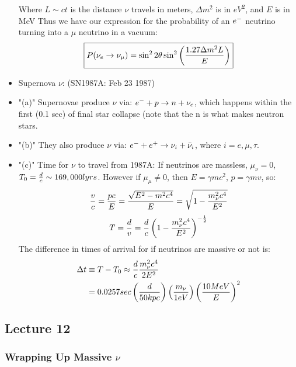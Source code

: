 \documentclass{article}
\def\hf{\frac12}
\def\hf{\frac12}
\begin{document}
\begin{itemize}
Where $L\sim ct$ is the distance $\nu$ travels in meters, $\Delta m^2$ is in 
$eV^2$, and $E$ is in MeV
Thus we have our expression for the probability of an $e^-$ neutrino turning
into a $\mu$ neutrino in a vacuum:
$$\boxed{P(\nu_e\to\nu_\mu)=\sin^22\theta\sin^2\left({1.27\Delta m^2L\over E}
\right)}$$
\item Supernova $\nu$: (SN1987A: Feb 23 1987)
\item"(a)" Supernovae produce $\nu$ via: $e^-+p\to n+\nu_e$,
which happens within the first (0.1 sec) of final star collapse (note that the
n is what makes neutron stars.
\item"(b)" They also produce $\nu$ via: 
$e^-+e^+\to\nu_i+\bar \nu_i$, where $i=e,\mu,\tau$.
\item"(c)" Time for $\nu$ to travel from 1987A:
If neutrinos are massless, $\mu_\nu=0$, $T_0={d\over c}\sim169,000 lyrs$.  
However if $\mu_\mu\ne0$, then $E=\gamma mc^2$, $p=\gamma mv$, so:
$${v\over c}={pc\over E}={\sqrt{E^2-m^2c^4}\over E}=\sqrt{1-{m_\nu^2c^4\over
E^2}}$$
$$T={d\over v}={d\over c}\left(1-{m_\nu^2c^4\over E^2}\right)^{-\hf}$$
The difference in times of arrival for if neutrinos are massive or not is:
\begin{align}
\Delta t&\equiv T-T_0\approx{d\over c}{m_\nu^2c^4\over 2E^2}\\
&=0.0257sec\left({d\over 50kpc}\right)\left({m_\nu\over1eV}\right)
\left({10MeV\over E}\right)^2\\
\end{align}
\end{itemize}

\subsection{Lecture 12}

\subsubsection*{ Wrapping Up Massive $\nu$}
\end{document}
